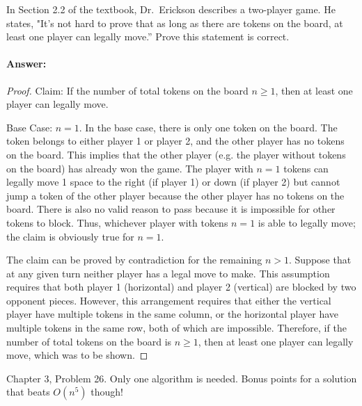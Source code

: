 \documentclass{article}
\begin{document}
In Section 2.2 of the textbook, Dr.~Erickson describes a two-player game.
He states, "It's not hard to prove that
as long as there are tokens on the board, at least one player can legally
move.''  Prove this statement is correct.

\paragraph{Answer:}
\begin{proof}
Claim: If the number of total tokens on the board $n \geq 1$, then at least one player can legally move.

Base Case: $n = 1$. In the base case, there is only one token on the board. The token belongs to either player 1 or player 2, and the other player has no tokens on the board. This implies that the other player (e.g. the player without tokens on the board) has already won the game. The player with $n = 1$ tokens can legally move 1 space to the right (if player 1) or down (if player 2) but cannot jump a token of the other player because the other player has no tokens on the board. There is also no valid reason to pass because it is impossible for other tokens to block. Thus, whichever player with tokens $n =1$ is able to legally move; the claim is obviously true for $n = 1$.

The claim can be proved by contradiction for the remaining $n > 1$. Suppose that at any given turn neither player has a legal move to make. This assumption requires that both player 1 (horizontal) and player 2 (vertical) are blocked by two opponent pieces. However, this arrangement requires that either the vertical player have multiple tokens in the same column, or the horizontal player have multiple tokens in the same row, both of which are impossible. Therefore, if the number of total tokens on the board is $n \geq 1$, then at least one player can legally move, which was to be shown.

\end{proof}


Chapter 3, Problem 26.  Only one algorithm is needed. Bonus points for a
solution that beats $O(n^5)$ though!
\end{document}
